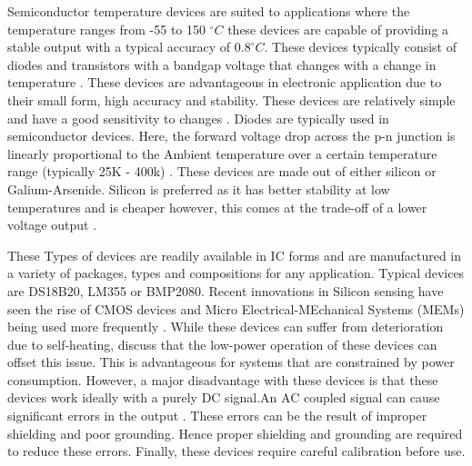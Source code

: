 Semiconductor temperature devices are suited to applications where the temperature ranges from -55 to 150 $^\circ C$ these devices are capable of providing a stable output with a typical accuracy of $0.8 ^\circ C$. These devices typically consist of diodes and transistors with a bandgap voltage that changes with a change in temperature \cite{childs2000review}. These devices are advantageous in electronic application due to their small form, high accuracy and stability. These devices are relatively simple and have a good sensitivity to changes \cite{childs2000review}. Diodes are typically used in semiconductor devices. Here, the forward voltage drop across the p-n junction is linearly proportional to the Ambient temperature over a certain temperature range (typically 25K - 400k) \cite{childs2000review}. These devices are made out of either silicon or Galium-Arsenide. Silicon is preferred as it has better stability at low temperatures and is cheaper however, this comes at the trade-off of a lower voltage output \cite{childs2000review}. \par These Types of devices are readily available in IC forms and are manufactured in a variety of packages, types and compositions for any application. Typical devices are DS18B20, LM355 or BMP2080. Recent innovations in Silicon sensing have seen the rise of CMOS devices and Micro Electrical-MEchanical Systems (MEMs) being used more frequently \cite{mansoor2015silicon}. While these devices can suffer from deterioration due to self-heating, \textcite{mansoor2015silicon} discuss that the low-power operation of these devices can offset this issue. This is advantageous for systems that are constrained by power consumption. However, a major disadvantage with these devices is that these devices work ideally with a purely DC signal.An AC coupled signal can cause significant errors in the output \cite{childs2000review} \cite{mansoor2015silicon}. These errors can be the result of improper shielding and poor grounding. Hence proper shielding and grounding are required to reduce these errors. Finally, these devices require careful calibration before use.


